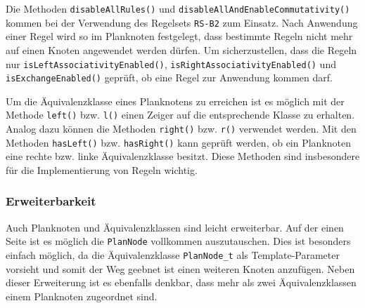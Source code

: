 Die Methoden \texttt{disable\-All\-Rules()} und \texttt{disable\-All\-And\-Enable\-Commutativity()} kommen bei der Verwendung des Regelsets \texttt{RS-B2} zum Einsatz. Nach Anwendung einer Regel wird so im Planknoten festgelegt, dass bestimmte Regeln nicht mehr auf einen Knoten angewendet werden dürfen. Um sicherzustellen, dass die Regeln nur \texttt{is\-Left\-Associativity\-Enabled()}, \texttt{is\-Right\-Associativity\-Enabled()} und \texttt{is\-Exchange\-Enabled()} geprüft, ob eine Regel zur Anwendung kommen darf.

Um die Äquivalenzklasse eines Planknotens zu erreichen ist es möglich mit der Methode \texttt{left()} bzw. \texttt{l()} einen Zeiger auf die entsprechende Klasse zu erhalten. Analog dazu können die Methoden \texttt{right()} bzw. \texttt{r()} verwendet werden. Mit den Methoden \texttt{has\-Left()} bzw. \texttt{has\-Right()} kann geprüft werden, ob ein Planknoten eine rechte bzw. linke Äquivalenzklasse besitzt. Diese Methoden sind insbesondere für die Implementierung von Regeln wichtig.


\subsubsection{Erweiterbarkeit}

Auch Planknoten und Äquivalenzklassen sind leicht erweiterbar. Auf der einen Seite ist es möglich die \texttt{Plan\-Node} vollkommen auszutauschen. Dies ist besonders einfach möglich, da die Äquivalenzklasse \texttt{PlanNode\_t} als Template-Parameter vorsieht und somit der Weg geebnet ist einen weiteren Knoten anzufügen. Neben dieser Erweiterung ist es ebenfalls denkbar, dass mehr als zwei Äquivalenzklassen einem Planknoten zugeordnet sind. 